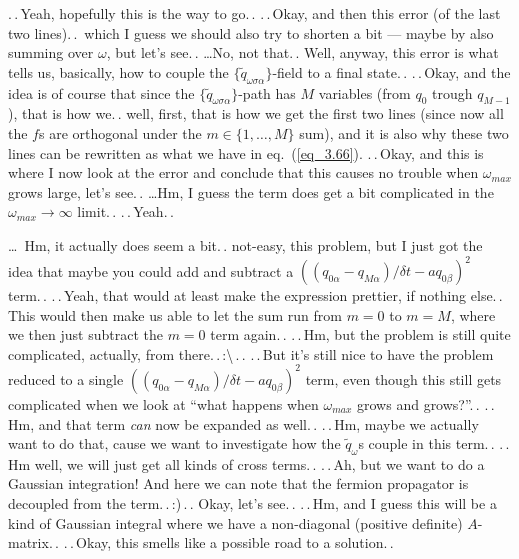 \documentclass{report}
\begin{document}
.\,.\,Yeah, hopefully this is the way to go.\,. .\,.\,Okay, and then this error (of the last two lines).\,.\, which I guess we should also try to shorten a bit --- maybe by also summing over $\omega$, but let's see.\,. \ldots No, not that.\,. Well, anyway, this error is what tells us, basically, how to couple the $\{\tilde q_{\omega\sigma\alpha}\}$-field to a final state.\,. .\,.\,Okay, and the idea is of course that since the $\{\tilde q_{\omega\sigma\alpha}\}$-path has $M$ variables (from $q_0$ trough $q_{M-1}$), that is how we.\,. well, first, that is how we get the first two lines (since now all the $f$s are orthogonal under the $m\in\{1, \ldots, M\}$ sum), and it is also why these two lines can be rewritten as what we have in eq.\ (\ref{eq_3.66}). .\,.\,Okay, and this is where I now look at the error and conclude that this causes no trouble when $\omega_{max}$ grows large, let's see.\,. 
\ldots Hm, I guess the term does get a bit complicated in the $\omega_{max}\to \infty$ limit.\,. .\,.\,Yeah.\,. %

\ldots\ Hm, it actually does seem a bit.\,. not-easy, this problem, but I just got the idea that maybe you could add and subtract a $((q_{0\alpha} - q_{M\alpha})/ \delta t - a q_{0\beta})^2$ term.\,. .\,.\,Yeah, that would at least make the expression prettier, if nothing else.\,. This would then make us able to let the sum run from $m=0$ to $m=M$, where we then just subtract the $m=0$ term again.\,. .\,.\,Hm, but the problem is still quite complicated, actually, from there.\,.\,:\textbackslash\,.\,. .\,.\,But it's still nice to have the problem reduced to a single $((q_{0\alpha} - q_{M\alpha})/ \delta t - a q_{0\beta})^2$ term, even though this still gets complicated when we look at ``what happens when $\omega_{max}$ grows and grows?''.\,. .\,.\,Hm, and that term \emph{can} now be expanded as well.\,. .\,.\,Hm, maybe we actually want to do that, cause we want to investigate how the $\tilde q_\omega$s couple in this term.\,. .\,.\,Hm well, we will just get all kinds of cross terms.\,. .\,.\,Ah, but we want to do a Gaussian integration! And here we can note that the fermion propagator is decoupled from the term.\,.\,:)\,.\,. Okay, let's see.\,. %
.\,.\,Hm, and I guess this will be a kind of Gaussian integral where we have a non-diagonal (positive definite) $A$-matrix.\,. .\,.\,Okay, this smells like a possible road to a solution.\,. 
\end{document}
